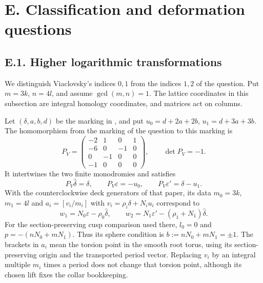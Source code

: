 \section{E. Classification and deformation questions}
\subsection{E.1. Higher logarithmic transformations}
We distinguish Viaclovsky's indices $0,1$ from the indices $1,2$ of
the question.  Put $m=3k$, $n=4l$, and assume $\gcd(m,n)=1$.
The lattice coordinates in this subsection are integral homology
coordinates, and matrices act on columns.

\begin{proposition}
Let $(\delta,a,b,d)$ be the marking in
\cite[Section 2, equations (2.1), (2.2), (2.7), (2.11)--(2.12)]{ViaLog26push},
and put $u_0=d+2a+2b$, $u_1=d+3a+3b$.
The homomorphism from the marking of the question to this marking is
\[
 P_V=\begin{pmatrix}
 -2&1&0&1\\-6&0&-1&0\\0&-1&0&0\\-1&0&0&0
 \end{pmatrix},\qquad \det P_V=-1.
\]
It intertwines the two finite monodromies and satisfies
\[
 P_V\widehat\delta=\delta,\qquad
 P_V\varepsilon=-u_0,\qquad
 P_V\varepsilon'=\delta-u_1.
\]
With the counterclockwise deck generators of that paper, its data
$m_0=3k$, $m_1=4l$ and
$a_i=[v_i/m_i]$ with $v_i=\rho_i\delta+N_i u_i$ correspond to
\[
 w_1=N_0\varepsilon-\rho_0\widehat\delta,
 \qquad
 w_2=N_1\varepsilon'-(\rho_1+N_1)\widehat\delta.
\]
For the section-preserving cusp comparison used there, $l_0=0$ and
$p=-(nN_0+mN_1)$.  Thus its sphere condition is
$b:=nN_0+mN_1=\pm1$.
The brackets in $a_i$ mean the torsion point in the smooth
root torus, using its section-preserving origin and the
transported period vector.  Replacing $v_i$ by an integral
multiple $m_i$ times a period does not change that torsion
point, although its chosen lift fixes the collar bookkeeping.
\end{proposition}

